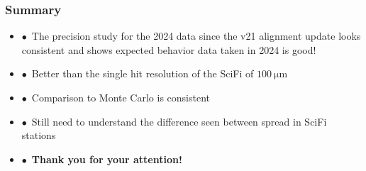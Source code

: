 \documentclass[aspectratio=1610, 12pt, xcolor=dvipsnames]{beamer}
\begin{document}
\begin{frame}\frametitle{Summary}
  \begin{itemize}
    \setlength\itemsep{0em}
    \item $\bullet$\, The precision study for the 2024 data since the v21 alignment update looks consistent and shows expected behavior \to data taken in 2024 is good!
    \item $\bullet$\, Better than the single hit resolution of the SciFi of $\SI{100}{\micro\metre}$
    \item $\bullet$\, Comparison to Monte Carlo is consistent
    \item $\bullet$\, Still need to understand the difference seen between spread in SciFi stations
    \item $\bullet$\, \textbf{Thank you for your attention!}
  \end{itemize}
\end{frame}
\end{document}

